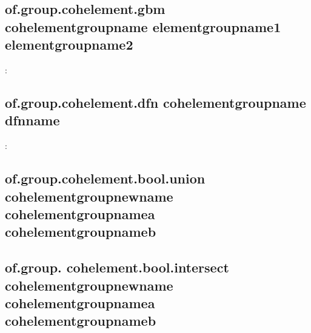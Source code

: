 \documentclass[letterpaper,10pt,english]{sphinxmanual}
\begin{document}
\subsection{of.group.cohelement.gbm cohelementgroupname elementgroupname1 elementgroupname2}
\label{\detokenize{rst_tutorials/command_line_guide:of-group-cohelement-gbm-cohelementgroupname-elementgroupname1-elementgroupname2}}\label{\detokenize{rst_tutorials/command_line_guide:section-7}}
:

\begin{sphinxVerbatim}[commandchars=\\\{\}]
    
\end{sphinxVerbatim}


\subsection{of.group.cohelement.dfn cohelementgroupname dfnname}
\label{\detokenize{rst_tutorials/command_line_guide:of-group-cohelement-dfn-cohelementgroupname-dfnname}}
:

\begin{sphinxVerbatim}[commandchars=\\\{\}]
  
\end{sphinxVerbatim}


\subsection{of.group.cohelement.bool.union cohelementgroupnewname cohelementgroupnamea cohelementgroupnameb}
\label{\detokenize{rst_tutorials/command_line_guide:of-group-cohelement-bool-union-cohelementgroupnewname-cohelementgroupnamea-cohelementgroupnameb}}

\subsection{of.group. cohelement.bool.intersect cohelementgroupnewname cohelementgroupnamea cohelementgroupnameb}
\label{\detokenize{rst_tutorials/command_line_guide:of-group-cohelement-bool-intersect-cohelementgroupnewname-cohelementgroupnamea-cohelementgroupnameb}}\label{\detokenize{rst_tutorials/command_line_guide:section-8}}
\end{document}
